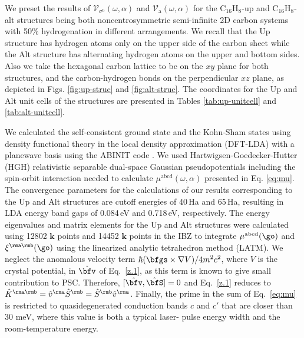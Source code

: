 \documentclass[prb,11pt,tightenlines,twocolumn,aps]{revtex4-1}
\begin{document}
We preset the results of $\mathcal{V}_{\sigma^{\mathrm{b}}}(\omega,\alpha)$ and
$\mathcal{V}_{\mathrm{a}}(\omega,\alpha)$ for the C$_{16}$H$_{8}$-up  and
C$_{16}$H$_{8}$-alt structures being both noncentrosymmetric semi-infinite 2D
carbon systems with 50\% hydrogenation in different arrangements. We recall
that the Up structure has hydrogen atoms only on the upper side of the carbon
sheet while the Alt structure has alternating hydrogen atoms on the upper and
bottom sides. Also we take the hexagonal carbon lattice to be on the $xy$ plane
for both structures, and the carbon-hydrogen bonds on the perpendicular $xz$
plane, as depicted in Figs. \ref{fig:up-struc} and \ref{fig:alt-struc}. The
coordinates for the Up and Alt unit cells of the structures are presented in
Tables \ref{tab:up-unitcell} and \ref{tab:alt-unitcell}.

We calculated the self-consistent ground state and the Kohn-Sham states using
density functional theory in the local density approximation (DFT-LDA) with a
planewave basis using the ABINIT code \cite{gonzeCPC09}.
% 
We used Hartwigsen-Goedecker-Hutter (HGH) relativistic separable dual-space
Gaussian pseudopotentials \cite{hartwigsenPRB98} including the spin-orbit
interaction needed to calculate $\mu^{\mathrm{abcd}}(\omega,\alpha)$ presented
in Eq. \eqref{eq:mu}.
% 
The convergence parameters for the calculations of our results corresponding to
the Up and Alt structures are cutoff energies of 40\,Ha and 65\,Ha, resulting
in LDA energy band gaps of 0.084\,eV and 0.718\,eV, respectively. The energy
eigenvalues and matrix elements for the Up and Alt structures were calculated
using 12802 $\mathbf{k}$ points and 14452 $\mathbf{k}$ points in the IBZ to
integrate $\mu^{\mathrm{abcd}}(\go)$ and $\xi^{\rma\rmb}(\go)$ using the
linearized analytic tetrahedron method (LATM).\cite{nastosPRB07} We neglect the
anomalous velocity term $\hbar(\bfgs\times\nabla V)/4m^2c^2$, where $V$ is the
crystal potential, in $\hat\bfv$ of Eq.~\eqref{z.1}, as this term is known to
give small contribution to PSC.\cite{bhatPRL05} Therefore,
$[\hat\bfv,\hat\bfS]=0$ and Eq.~\eqref{z.1} reduces to $\hat K^{\rma\rmb}=\hat
v^\rma \hat S^\rmb=\hat S^\rmb \hat v^\rma$. Finally, the prime in the sum of
Eq.~\eqref{eq:mu} is restricted to quasidegenerated conduction bands $c$ and
$c'$ that are closer than 30 meV, where this value is both a typical laser-
pulse energy width and the room-temperature energy.\cite{nastosPRB07}
% 
\end{document}
